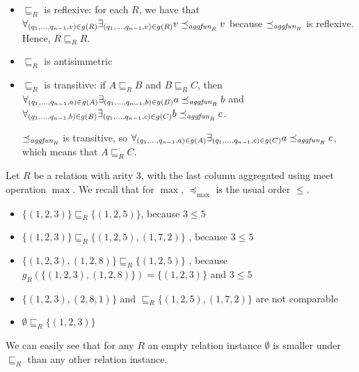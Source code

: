 \begin{itemize}
\item $\sqsubseteq_R$ is reflexive: for each $R$, we have that  $\forall_{(q_1, ..., q_{n-1}, v) \in g(R)} \exists_{(q_1, ..., q_{n-1}, v) \in g(R)} v \preceq_{\textit{aggfun}_R} v $ because $\preceq_{\textit{aggfun}_R}$ is reflexive. Hence, $R \sqsubseteq_R R$.
\item $\sqsubseteq_R$ is antisimmetric 
\item $\sqsubseteq_R$ is transitive: if $A \sqsubseteq_R B$ and $B \sqsubseteq_R  C$, then $\forall_{(q_1, ..., q_{n-1}, a) \in g(A)} \exists_{(q_1, ..., q_{n-1}, b) \in g(B)} a \preceq_{\textit{aggfun}_R} b $ and $\forall_{(q_1, ..., q_{n-1}, b) \in g(B)} \exists_{(q_1, ..., q_{n-1}, c) \in g(C)} b \preceq_{\textit{aggfun}_R} c$.

$\preceq_{\textit{aggfun}_R}$ is transitive, so $\forall_{(q_1, ..., q_{n-1}, a) \in g(A)} \exists_{(q_1, ..., q_{n-1}, c) \in g(C)} a \preceq_{\textit{aggfun}_R} c $, which means that $A \sqsubseteq_R C$.
\end{itemize}



\begin{exmp}
Let $R$ be a relation with arity $3$, with the last column aggregated using meet operation $\max$.
We recall that for $ \max $, $ \preceq_{\max} $ is the usual order $ \le $.
\begin{itemize}
\item $\{(1, 2, 3)\} \sqsubseteq_R \{(1, 2, 5)\}$, because $3 \le 5$
\item $\{(1, 2, 3)\} \sqsubseteq_R \{(1, 2, 5), (1, 7, 2)\}$ , because $3 \le 5$
\item $\{(1, 2, 3), (1, 2, 8)\} \sqsubseteq_R \{(1, 2, 5)\}$ , because $g_R(\{(1, 2, 3), (1, 2, 8)\}) = \{(1,2,3)\}$ and $3 \le 5$
\item $\{(1, 2, 3), (2, 8, 1)\}$ and  $\sqsubseteq_R \{(1, 2, 5), (1, 7, 2)\}$ are not comparable
\item $\emptyset \sqsubseteq_R \{(1, 2, 3)\}$
\end{itemize}
\end{exmp}

We can easily see that for any $R$ an empty relation instance $\emptyset$ is smaller under $\sqsubseteq_R$  than any other relation instance.


